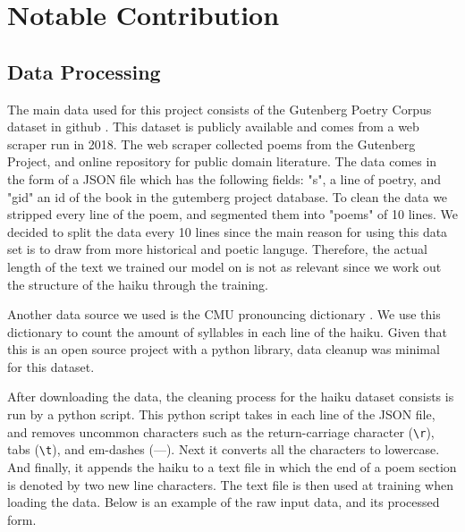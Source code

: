 \documentclass{article} %
\begin{document}
\section{Notable Contribution}

\subsection{Data Processing}
The main data used for this project consists of the Gutenberg Poetry Corpus dataset in
github \citep{gutenberg_dataset}.
This dataset is publicly available and comes from a web scraper run in 2018.
The web scraper collected poems from the Gutenberg Project, and online repository for public domain literature.
The data comes in the form of a JSON file which has the following fields:
"s", a line of poetry, and "gid" an id of the book in the gutemberg project database.
To clean the data we stripped every line of the poem, and segmented them into "poems" of 10 lines.
We decided to split the data every 10 lines since the main reason for using this data set is to draw from more historical and poetic languge.
Therefore, the actual length of the text we trained our model on is not as relevant since we work out the structure of the haiku through the training.

Another data source we used is the CMU pronouncing dictionary \citep{cmu_pronouncing_dictionary}.
We use this dictionary to count the amount of syllables in each line of the haiku.
Given that this is an open source project with a python library, data cleanup was minimal for this dataset.


After downloading the data, the cleaning process for the haiku dataset consists is run by a python script.
This python script takes in each line of the JSON file, and removes uncommon characters such as the return-carriage character (\texttt{\textbackslash r}), tabs (\texttt{\textbackslash t}), and em-dashes (—).
Next it converts all the characters to lowercase.
And finally, it appends the haiku to a text file in which the end of a poem section is denoted by two new line characters.
The text file is then used at training when loading the data.
Below is an example of the raw input data, and its processed form.
\end{document}
